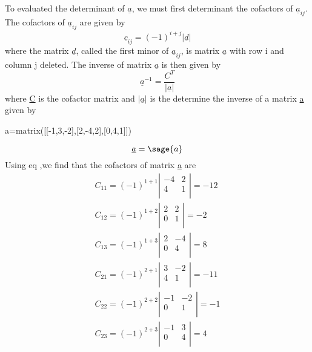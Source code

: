 \documentclass[12pt]{report}
\begin{document}
To evaluated the determinant of $\underline{a}$, we must first determinant the
cofactors of $\underline{a}_{ij}$.
The cofactors of $\underline{a}_{ij}$ are given by
\begin{equation}\underline{c}_{ij}=(-1)^{i+j} |\underline{d}|\end{equation}
where the matrix $\underline{d}$, called the first minor of $\underline{a}_{ij}$, is
matrix $\underline{a}$ with row i and column j deleted. The inverse of matrix
$\underline{a}$ is then given by
\begin{equation}\underline{a}^{-1}=\frac{C^{T}}{|\underline{a}|}\label{eq:cofinverse}\end{equation}
where \underline{C} is the cofactor matrix and $|\underline{a}|$ is the determine the inverse of a matrix \underline{a} given by 
\begin{sagesilent}
a=matrix([[-1,3,-2],[2,-4,2],[0,4,1]])
\end{sagesilent}
\begin{equation}\underline{a} = \sage{a} \end{equation}
Using eq ,we find that the cofactors of matrix \underline{a} are 
\begin{eqnarray} C_{11} = (-1)^{1+1} \left|\begin{array}{rr} -4 & 2 \\4 & 1\\ \end{array}\right| = -12 \nonumber 
\\ C_{12} = (-1)^{1+2} \left|\begin{array}{rr} 2 & 2 \\0 & 1\\ \end{array}\right| = -2 \nonumber 
\\ C_{13} = (-1)^{1+3} \left|\begin{array}{rr} 2 & -4 \\0 & 4\\ \end{array}\right| = 8 \nonumber 
\\ C_{21} = (-1)^{2+1} \left|\begin{array}{rr} 3 & -2 \\4 & 1\\ \end{array}\right| = -11 \nonumber 
\\C_{22} = (-1)^{2+2} \left|\begin{array}{rr} -1 & -2 \\0 & 1\\ \end{array}\right| = -1 \nonumber 
\\ C_{23} = (-1)^{2+3} \left|\begin{array}{rr} -1 & 3 \\0 & 4\\ \end{array}\right| = 4 \label{eq:cofa}\end{eqnarray}  
\end{document}

